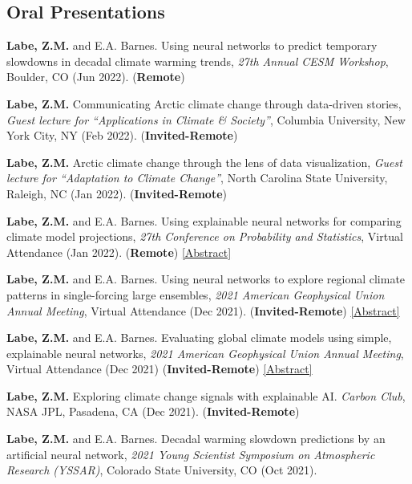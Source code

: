 \documentclass[margin,line,palatino,courier,10pt]{res}
\begin{document}
\begin{resume}
\section{\sc \textcolor{Cerulean}{\large{\textbf{Oral Presentations}}}}
\begin{etaremune}[leftmargin=0in,topsep=0in,parsep=0in]
\item \textbf{Labe, Z.M.} and E.A. Barnes. Using neural networks to predict temporary slowdowns in decadal climate warming trends, \textit{27th Annual CESM Workshop}, Boulder, CO (Jun 2022). (\textbf{Remote})
\item \textbf{Labe, Z.M.} Communicating Arctic climate change through data-driven stories, \textit{Guest lecture for ``Applications in Climate \& Society''}, Columbia University, New York City, NY (Feb 2022). (\textbf{Invited-Remote}) 
\item \textbf{Labe, Z.M.} Arctic climate change through the lens of data visualization, \textit{Guest lecture for ``Adaptation to Climate Change''}, North Carolina State University, Raleigh, NC (Jan 2022). (\textbf{Invited-Remote}) 
\item \textbf{Labe, Z.M.} and E.A. Barnes. Using explainable neural networks for comparing climate model projections, \textit{27th Conference on Probability and Statistics}, Virtual Attendance (Jan 2022). (\textbf{Remote}) \href{https://ams.confex.com/ams/102ANNUAL/meetingapp.cgi/Paper/392538}{[Abstract]}
\item \textbf{Labe, Z.M.} and E.A. Barnes. Using neural networks to explore regional climate patterns in single-forcing large ensembles, \textit{2021 American Geophysical Union Annual Meeting}, Virtual Attendance (Dec 2021). (\textbf{Invited-Remote}) \href{https://agu.confex.com/agu/fm21/meetingapp.cgi/Paper/798039}{[Abstract]}
\item \textbf{Labe, Z.M.} and E.A. Barnes. Evaluating global climate models using simple, explainable neural networks, \textit{2021 American Geophysical Union Annual Meeting}, Virtual Attendance (Dec 2021) (\textbf{Invited-Remote}) \href{https://agu.confex.com/agu/fm21/meetingapp.cgi/Paper/797879}{[Abstract]}
\item \textbf{Labe, Z.M.} Exploring climate change signals with explainable AI. \textit{Carbon Club}, NASA JPL, Pasadena, CA (Dec 2021). (\textbf{Invited-Remote})
\item \textbf{Labe, Z.M.} and E.A. Barnes. Decadal warming slowdown predictions by an artificial neural network, \textit{2021 Young Scientist Symposium on Atmospheric Research (YSSAR)}, Colorado State University, CO (Oct 2021).

\end{etaremune}
\end{resume}
\end{document}

